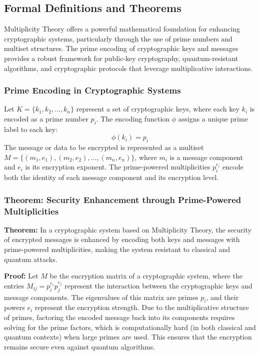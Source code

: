 \documentclass[%
 preprint, linenumbers,
 amsmath,amssymb,
 aps, physrev,
]{revtex4-2}
\begin{document}
\subsection{Formal Definitions and Theorems}
Multiplicity Theory offers a powerful mathematical foundation for enhancing cryptographic systems, particularly through the use of prime numbers and multiset structures. The prime encoding of cryptographic keys and messages provides a robust framework for public-key cryptography, quantum-resistant algorithms, and cryptographic protocols that leverage multiplicative interactions.

\subsubsection{Prime Encoding in Cryptographic Systems}
Let \( K = \{k_1, k_2, \dots, k_n\} \) represent a set of cryptographic keys, where each key \( k_i \) is encoded as a prime number \( p_i \). The encoding function \( \phi \) assigns a unique prime label to each key:
\[
\phi(k_i) = p_i
\]
The message or data to be encrypted is represented as a multiset \( M = \{(m_1, e_1), (m_2, e_2), \dots, (m_n, e_n)\} \), where \( m_i \) is a message component and \( e_i \) is its encryption exponent. The prime-powered multiplicities \( p_i^{e_i} \) encode both the identity of each message component and its encryption level.

\subsubsection{Theorem: Security Enhancement through Prime-Powered Multiplicities}
\textbf{Theorem:} In a cryptographic system based on Multiplicity Theory, the security of encrypted messages is enhanced by encoding both keys and messages with prime-powered multiplicities, making the system resistant to classical and quantum attacks.

\textbf{Proof:} Let \( M \) be the encryption matrix of a cryptographic system, where the entries \( M_{ij} = p_i^{e_i} p_j^{e_j} \) represent the interaction between the cryptographic keys and message components. The eigenvalues of this matrix are primes \( p_i \), and their powers \( e_i \) represent the encryption strength. Due to the multiplicative structure of primes, factoring the encoded message back into its components requires solving for the prime factors, which is computationally hard (in both classical and quantum contexts) when large primes are used. This ensures that the encryption remains secure even against quantum algorithms.
\end{document}
